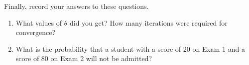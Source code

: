 \documentclass[10pt,a4paper]{article}
\begin{document}
  Finally, record your answers to these questions.
  \begin{enumerate}
    \item What values of $\theta$ did you get? How many iterations were required for convergence?
    \item What is the probability that a student with a score of 20 on Exam 1 and a score of 80 on Exam 2 will not be admitted?
  \end{enumerate}
\end{document}
